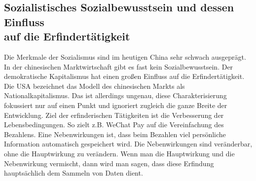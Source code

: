 \documentclass[11pt,a4paper]{article}
\begin{document}
\subsection[Sozialistisches Sozialbewusstsein und dessen Einfluss auf die
  Erfindertätigkeit]{Sozialistisches Sozialbewusstsein und dessen Einfluss\\ auf
  die Erfindertätigkeit}

Die Merkmale der Sozialismus sind im heutigen China sehr schwach ausgeprägt.
In der chinesischen Marktwirtschaft gibt es fast kein Sozialbewusstsein. Der
demokratische Kapitalismus hat einen großen Einfluss auf die
Erfindertätigkeit.  Die USA bezeichnet das Modell des chinesischen Markts als
Nationalkapitalismus. Das ist allerdings ungenau, diese Charakterisierung
fokussiert nur auf einen Punkt und ignoriert zugleich die ganze Breite der
Entwicklung. Ziel der erfinderischen Tätigkeiten ist die Verbesserung der
Lebensbedingungen. So zielt z.B. WeChat Pay auf die Vereinfachung des
Bezahlens. Eine Nebenwirkungen ist, dass beim Bezahlen viel persönliche
Information automatisch gespeichert wird. Die Nebenwirkungen sind veränderbar,
ohne die Hauptwirkung zu verändern. Wenn man die Hauptwirkung und die
Nebenwirkung vermischt, dann wird man sagen, dass diese Erfindung
hauptsächlich dem Sammeln von Daten dient.
\end{document}
